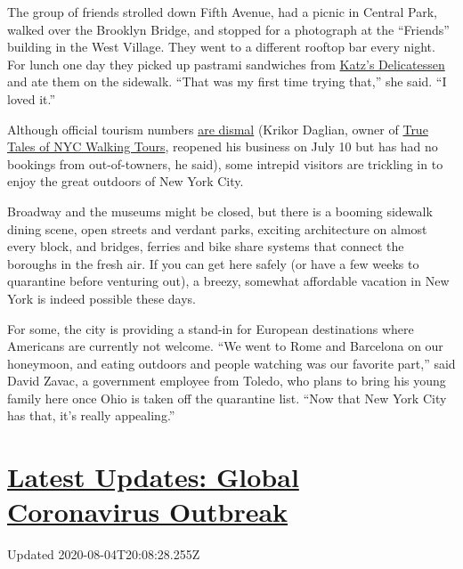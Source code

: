 The group of friends strolled down Fifth Avenue, had a picnic in Central
Park, walked over the Brooklyn Bridge, and stopped for a photograph at
the ``Friends'' building in the West Village. They went to a different
rooftop bar every night. For lunch one day they picked up pastrami
sandwiches from \href{https://katzsdelicatessen.com/}{Katz's
Delicatessen} and ate them on the sidewalk. ``That was my first time
trying that,'' she said. ``I loved it.''

Although official tourism numbers
\href{https://www.nytimes.com/2020/07/24/nyregion/nyc-tourism-coronavirus.html}{are
dismal} (Krikor Daglian, owner of
\href{http://www.truetalesnyc.com/}{True Tales of NYC Walking Tours},
reopened his business on July 10 but has had no bookings from
out-of-towners, he said), some intrepid visitors are trickling in to
enjoy the great outdoors of New York City.

Broadway and the museums might be closed, but there is a booming
sidewalk dining scene, open streets and verdant parks, exciting
architecture on almost every block, and bridges, ferries and bike share
systems that connect the boroughs in the fresh air. If you can get here
safely (or have a few weeks to quarantine before venturing out), a
breezy, somewhat affordable vacation in New York is indeed possible
these days.

For some, the city is providing a stand-in for European destinations
where Americans are currently not welcome. ``We went to Rome and
Barcelona on our honeymoon, and eating outdoors and people watching was
our favorite part,'' said David Zavac, a government employee from
Toledo, who plans to bring his young family here once Ohio is taken off
the quarantine list. ``Now that New York City has that, it's really
appealing.''

\hypertarget{latest-updates-global-coronavirus-outbreak}{%
\section{\texorpdfstring{\href{https://www.nytimes.com/2020/08/04/world/coronavirus-cases.html?action=click\&pgtype=Article\&state=default\&region=MAIN_CONTENT_1\&context=storylines_live_updates}{Latest
Updates: Global Coronavirus
Outbreak}}{Latest Updates: Global Coronavirus Outbreak}}\label{latest-updates-global-coronavirus-outbreak}}

Updated 2020-08-04T20:08:28.255Z

